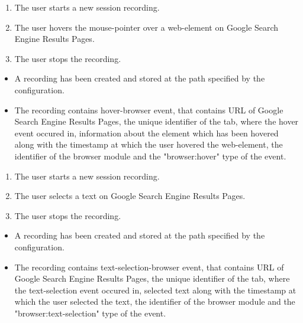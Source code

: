 \begin{tests}
	
	{\begin{enumerate}
		\item The \gls{user} starts a new session recording.
		\item The \gls{user} hovers the mouse-pointer over a web-element on Google Search Engine Results Pages.
		\item The \gls{user} stops the recording.
	\end{enumerate}}
	{\begin{itemize}
		\item A recording has been created and stored at the path specified by the configuration.
		\item The recording contains hover-browser event, that contains URL of Google Search Engine Results Pages, the unique identifier of the tab, where the hover event occured in, information about the element which has been hovered along with the timestamp at which the user hovered the web-element, the identifier of the browser module and the "browser:hover" type of the event.
	\end{itemize}}
	
	
	{\begin{enumerate}
		\item The \gls{user} starts a new session recording.
		\item The \gls{user} selects a text on Google Search Engine Results Pages.
		\item The \gls{user} stops the recording.
	\end{enumerate}}
	{\begin{itemize}
		\item A recording has been created and stored at the path specified by the configuration.
		\item The recording contains text-selection-browser event, that contains URL of Google Search Engine Results Pages, the unique identifier of the tab, where the text-selection event occured in, selected text along with the timestamp at which the user selected the text, the identifier of the browser module and the "browser:text-selection" type of the event.
	\end{itemize}}
	

\end{tests}
